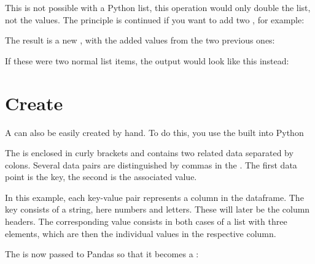 \medskip





\medskip

This is not possible with a Python list, this operation would only double the list, not the values. The principle is continued if you want to add two , for example:
\medskip




\medskip

The result is a new , with the added values from the two previous ones:

\medskip




\medskip
If these were two normal list items, the output would look like this instead:

\medskip

\PYTHON{[1, 2, 3, 4, 5, 6]}

\section{Create }

A  can also be easily created by hand. To do this, you use the 
built into Python


The  is enclosed in curly brackets and contains two related data separated by colons. Several data pairs are distinguished by commas in the . The first data point is the key, the second is the associated value.

In this example, each key-value pair represents a column in the dataframe. The key consists of a string, here numbers and letters. These will later be the column headers. The corresponding value consists in both cases of a list with three elements, which are then the individual values in the respective column.

The  is now passed to Pandas so that it becomes a :
\medskip
{}
\medskip

